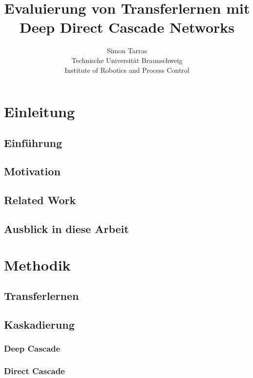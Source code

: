 \documentclass[ngerman]{report}
\title{Evaluierung von Transferlernen mit Deep Direct Cascade Networks}
\author{Simon Tarras\\
Technische Universität Braunschweig\\
Institute of Robotics and Process Control}
\begin{document}
    \maketitle
    \tableofcontents

    \chapter{Einleitung}  %
    \section{Einführung}
    
    \section{Motivation}
    
    \section{Related Work}
    
    
    \section{Ausblick in diese Arbeit}
    

    \chapter{Methodik}  %
    
    \section{Transferlernen}  %
    
    \section{Kaskadierung}
    
    \subsection{Deep Cascade}
    
    \subsection{Direct Cascade}
    
\end{document}
